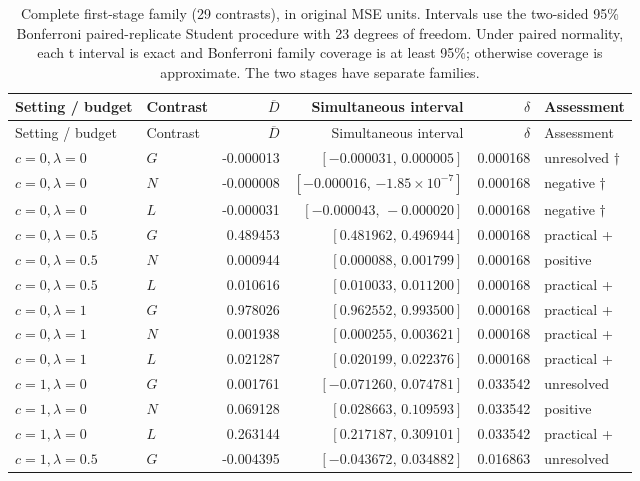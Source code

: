 \clearpage
\begingroup\small\setlength{\tabcolsep}{3pt}
\begin{longtable}{llrrrl}
\caption{Complete first-stage family (29 contrasts), in original MSE units. Intervals use the two-sided 95\% Bonferroni paired-replicate Student procedure with 23 degrees of freedom. Under paired normality, each t interval is exact and Bonferroni family coverage is at least 95\%; otherwise coverage is approximate. The two stages have separate families.}\label{c:tab:all-stageone}\\
\toprule
Setting / budget & Contrast & $\overline D$ & Simultaneous interval & $\delta$ & Assessment \\
\midrule
\endfirsthead
\toprule
Setting / budget & Contrast & $\overline D$ & Simultaneous interval & $\delta$ & Assessment \\
\midrule
\endhead
\bottomrule\endfoot
$c=0,\lambda=0$ & $G$ & -0.000013 & $[-0.000031,\,0.000005]$ & 0.000168 & unresolved $\dagger$ \\
$c=0,\lambda=0$ & $N$ & -0.000008 & $[-0.000016,\,\ensuremath{-1.85\times10^{-7}}]$ & 0.000168 & negative $\dagger$ \\
$c=0,\lambda=0$ & $L$ & -0.000031 & $[-0.000043,\,-0.000020]$ & 0.000168 & negative $\dagger$ \\
$c=0,\lambda=0.5$ & $G$ & 0.489453 & $[0.481962,\,0.496944]$ & 0.000168 & practical + \\
$c=0,\lambda=0.5$ & $N$ & 0.000944 & $[0.000088,\,0.001799]$ & 0.000168 & positive \\
$c=0,\lambda=0.5$ & $L$ & 0.010616 & $[0.010033,\,0.011200]$ & 0.000168 & practical + \\
$c=0,\lambda=1$ & $G$ & 0.978026 & $[0.962552,\,0.993500]$ & 0.000168 & practical + \\
$c=0,\lambda=1$ & $N$ & 0.001938 & $[0.000255,\,0.003621]$ & 0.000168 & practical + \\
$c=0,\lambda=1$ & $L$ & 0.021287 & $[0.020199,\,0.022376]$ & 0.000168 & practical + \\
$c=1,\lambda=0$ & $G$ & 0.001761 & $[-0.071260,\,0.074781]$ & 0.033542 & unresolved \\
$c=1,\lambda=0$ & $N$ & 0.069128 & $[0.028663,\,0.109593]$ & 0.033542 & positive \\
$c=1,\lambda=0$ & $L$ & 0.263144 & $[0.217187,\,0.309101]$ & 0.033542 & practical + \\
$c=1,\lambda=0.5$ & $G$ & -0.004395 & $[-0.043672,\,0.034882]$ & 0.016863 & unresolved \\

\end{longtable}

